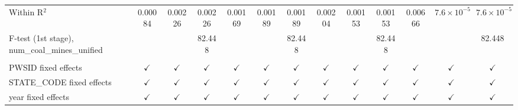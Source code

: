 \begin{table}[htbp]
\begin{adjustbox}{width = \textwidth, center}
\begin{tabular}{lcccccccccccc}
         Within R$^2$                                     & 0.00084       & 0.00226        & 0.00226       & 0.00169       & 0.00189       & 0.00189       & 0.00204       & 0.00153       & 0.00153       & 0.00666       & $7.6\times 10^{-5}$  & $7.6\times 10^{-5}$\\   
         F-test (1st stage), num\_coal\_mines\_unified    &               &                & 82.448        &               &               & 82.448        &               &               & 82.448        &               &                      & 82.448\\  
          \\
         PWSID fixed effects                              & $\checkmark$  & $\checkmark$   & $\checkmark$  & $\checkmark$  & $\checkmark$  & $\checkmark$  & $\checkmark$  & $\checkmark$  & $\checkmark$  & $\checkmark$  & $\checkmark$         & $\checkmark$\\   
         STATE\_CODE fixed effects                        & $\checkmark$  & $\checkmark$   & $\checkmark$  & $\checkmark$  & $\checkmark$  & $\checkmark$  & $\checkmark$  & $\checkmark$  & $\checkmark$  & $\checkmark$  & $\checkmark$         & $\checkmark$\\   
         year fixed effects                               & $\checkmark$  & $\checkmark$   & $\checkmark$  & $\checkmark$  & $\checkmark$  & $\checkmark$  & $\checkmark$  & $\checkmark$  & $\checkmark$  & $\checkmark$  & $\checkmark$         & $\checkmark$\\   
         \bottomrule
      \end{tabular}
   \end{adjustbox}
\end{table}


